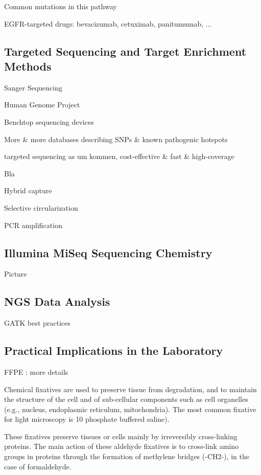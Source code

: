 Common mutations in this pathway

EGFR-targeted drugs:
bevacizumab, cetuximab, panitumumab, ...

\subsection{Targeted Sequencing and Target Enrichment Methods}

Sanger Sequencing

Human Genome Project

Benchtop sequencing devices

More & more databases describing SNPs & known pathogenic hotspots

targeted sequencing as um kommen, cost-effective & fast & high-coverage

Bla {\cite{enrichment_methods:2011}}

Hybrid capture

Selective circularization

PCR amplification

\subsection{Illumina MiSeq Sequencing Chemistry}

Picture

\subsection{NGS Data Analysis}

GATK best practices

\subsection{Practical Implications in the Laboratory}

FFPE : more details

Chemical fixatives are used to preserve tissue from degradation, and to maintain
the structure of the cell and of sub-cellular components such as cell organelles
(e.g., nucleus, endoplasmic reticulum, mitochondria). The most common fixative
for light microscopy is 10%
phosphate buffered saline).

These fixatives preserve tissues or cells mainly by irreversibly cross-linking
proteins. The main action of these aldehyde fixatives is to cross-link amino
groups in proteins through the formation of methylene bridges (-CH2-), in the
case of formaldehyde.


